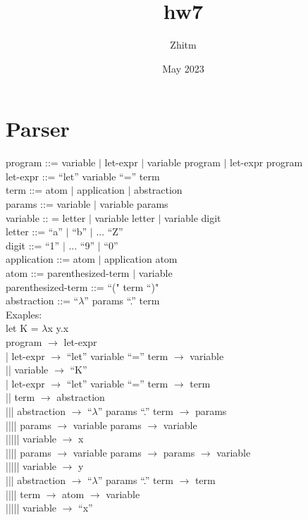 \documentclass{article}
\title{hw7}
\author{Zhitm}
\date{May 2023}
\begin{document}
\maketitle

\section{Parser}

program ::= variable $\vert$ let-expr $\vert$ variable program $\vert$ let-expr program\\
let-expr ::= ``let'' variable ``='' term\\
term ::= atom $\vert$ application $\vert$ abstraction \\
params ::= variable $\vert$ variable params\\
variable :: = letter $\vert$ variable letter $\vert$ variable digit\\
letter ::= ``a'' $\vert$ ``b'' $\vert$ ... ``Z''\\
digit ::= ``1'' $\vert$ ... ``9'' $\vert$ ``0''\\
application ::= atom $\vert$ application atom\\
atom ::= parenthesized-term $\vert$ variable\\
parenthesized-term ::= ``(" term ``)"\\
abstraction ::= ``$\lambda$'' params ``.'' term\\

Exaples:\\
let K = $\lambda$x y.x\\
program $\rightarrow$ let-expr\\
| let-expr $\rightarrow$ ``let'' variable ``='' term $\rightarrow$ variable\\
|| variable $\rightarrow$ ``K''\\
| let-expr $\rightarrow$ ``let'' variable ``='' term $\rightarrow$ term\\
|| term $\rightarrow$ abstraction\\
||| abstraction $\rightarrow$ ``$\lambda$'' params ``.'' term $\rightarrow$ params\\
|||| params $\rightarrow$ variable params $\rightarrow$ variable\\
||||| variable $\rightarrow$ x\\
|||| params $\rightarrow$ variable params $\rightarrow$ params $\rightarrow$ variable\\
||||| variable $\rightarrow$ y\\
||| abstraction $\rightarrow$ ``$\lambda$'' params ``.'' term $\rightarrow$ term\\
|||| term $\rightarrow$ atom $\rightarrow$ variable\\
||||| variable $\rightarrow$ ``x''\\
\end{document}
